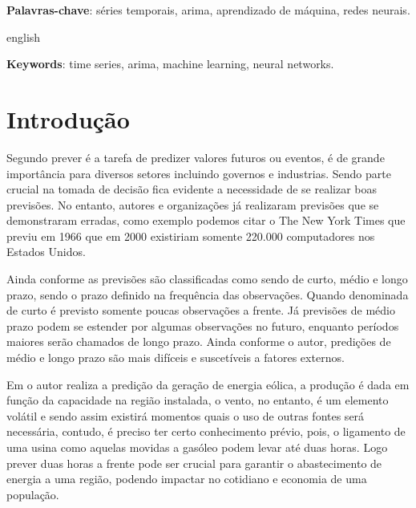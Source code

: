 \documentclass[
    12pt,
    oneside,
    a4paper,
    english,
    brazil
]{abntex2}
\begin{document}
\frenchspacing

\imprimircapa{}

\imprimirfolhaderosto{}

\begin{resumo}

    \textbf{Palavras-chave}: séries temporais, arima, aprendizado de máquina,
    redes neurais.
\end{resumo}

\begin{resumo}[Abstract]
    \begin{otherlanguage*}{english}

        \textbf{Keywords}: time series, arima, machine learning, neural
        networks.
    \end{otherlanguage*}
\end{resumo}

\textual{}

\tableofcontents*
\cleardoublepage{}

\chapter{Introdução}

Segundo  prever é a tarefa de predizer valores futuros ou
eventos, é de grande importância para diversos setores incluindo governos e
industrias. Sendo parte crucial na tomada de decisão fica evidente a necessidade
de se realizar boas previsões. No entanto, autores e organizações já realizaram
previsões que se demonstraram erradas, como exemplo podemos citar o The New York
Times que previu em 1966 que em 2000 existiriam somente 220.000 computadores nos
Estados Unidos.

Ainda conforme  as previsões são classificadas como sendo de
curto, médio e longo prazo, sendo o prazo definido na frequência das
observações.  Quando denominada de curto é previsto somente poucas observações a
frente. Já previsões de médio prazo podem se estender por algumas observações no
futuro, enquanto períodos maiores serão chamados de longo prazo. Ainda conforme
o autor, predições de médio e longo prazo são mais difíceis e suscetíveis a
fatores externos.

Em  o autor realiza a predição da geração de energia
eólica, a produção é dada em função da capacidade na região instalada, o vento,
no entanto, é um elemento volátil e sendo assim existirá momentos quais o uso de
outras fontes será necessária, contudo, é preciso ter certo conhecimento prévio,
pois, o ligamento de uma usina como aquelas movidas a gasóleo podem levar até
duas horas. Logo prever duas horas a frente pode ser crucial para garantir o
abastecimento de energia a uma região, podendo impactar no cotidiano e economia
de uma população.
\end{document}
